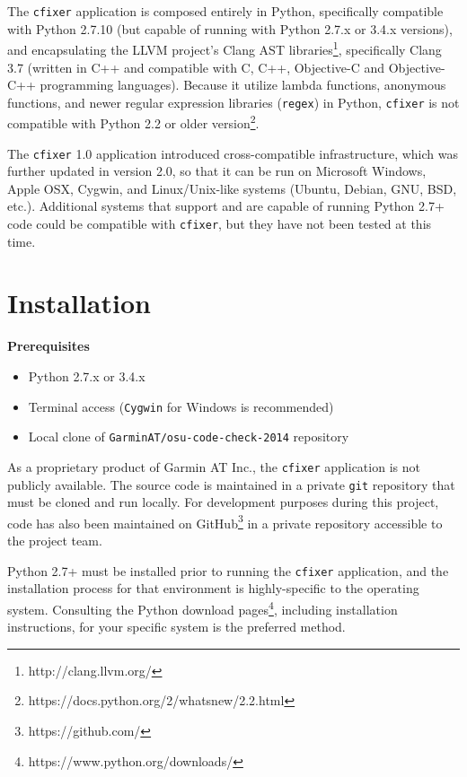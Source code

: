 \documentclass[11pt]{scrreprt}
\begin{document}
The \texttt{cfixer} application is composed entirely in Python, specifically compatible with Python 2.7.10 (but capable of running with Python 2.7.x or 3.4.x versions), and encapsulating the LLVM project's Clang AST libraries\footnote{http://clang.llvm.org/}, specifically Clang 3.7 (written in C++ and compatible with C, C++, Objective-C and Objective-C++ programming languages).
Because it utilize lambda functions, anonymous functions, and newer regular expression libraries (\texttt{regex}) in Python, \texttt{cfixer} is not compatible with Python 2.2 or older version\footnote{https://docs.python.org/2/whatsnew/2.2.html}.

The \texttt{cfixer} 1.0 application introduced cross-compatible infrastructure, which was further updated in version 2.0, so that it can be run on Microsoft Windows, Apple OSX, Cygwin, and Linux/Unix-like systems (Ubuntu, Debian, GNU, BSD, etc.).
Additional systems that support and are capable of running Python 2.7+ code could be compatible with \texttt{cfixer}, but they have not been tested at this time.

\section{Installation}

\textbf{Prerequisites}
\begin{itemize}
	\item Python 2.7.x or 3.4.x
	\item Terminal access (\texttt{Cygwin} for Windows is recommended)
	\item Local clone of \texttt{GarminAT/osu-code-check-2014} repository
\end{itemize}

As a proprietary product of Garmin AT Inc., the \texttt{cfixer} application is not publicly available.
The source code is maintained in a private \texttt{git} repository that must be cloned and run locally.
For development purposes during this project, code has also been maintained on GitHub\footnote{https://github.com/} in a private repository accessible to the project team.

Python 2.7+ must be installed prior to running the \texttt{cfixer} application, and the installation process for that environment is highly-specific to the operating system. Consulting the Python download pages\footnote{https://www.python.org/downloads/}, including installation instructions, for your specific system is the preferred method.
\end{document}

